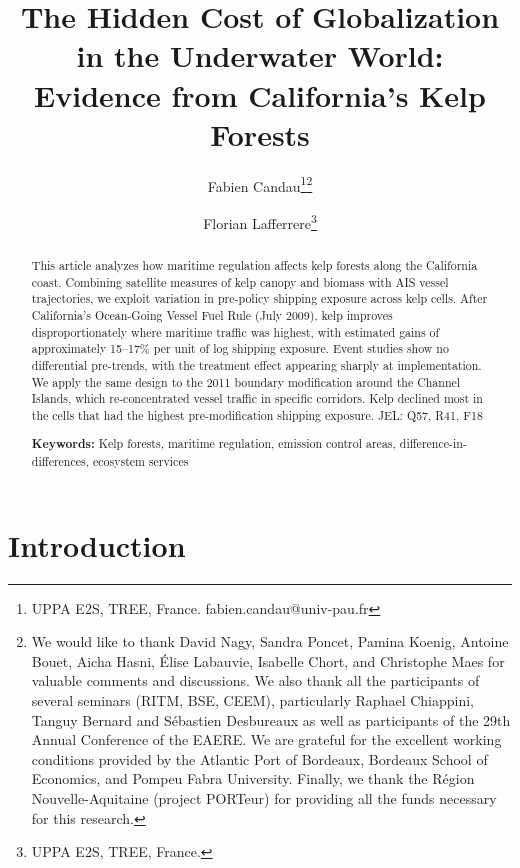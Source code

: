 \documentclass[12pt]{article}
\begin{document}
\title{The Hidden Cost of Globalization in the Underwater World: Evidence from California's Kelp Forests}
\author{\large Fabien Candau\thanks{UPPA E2S, TREE, France. fabien.candau@univ-pau.fr}\thanks{We would like to thank David Nagy, Sandra Poncet, Pamina Koenig, Antoine Bouet, Aicha Hasni, \'{E}lise Labauvie, Isabelle Chort, and Christophe Maes for valuable comments and discussions. We also thank all the participants of several seminars (RITM, BSE, CEEM), particularly Raphael Chiappini, Tanguy Bernard and S\'{e}bastien Desbureaux as well as participants of the 29th Annual Conference of the EAERE.
We are grateful for the excellent working conditions provided by the Atlantic Port of Bordeaux, Bordeaux School of Economics, and Pompeu Fabra University. Finally, we thank the R\'{e}gion Nouvelle-Aquitaine (project PORTeur) for providing all the funds necessary for this research.} \and \large Florian Lafferrere\thanks{UPPA E2S, TREE, France.}}
\maketitle
\begin{abstract}
This article analyzes how maritime regulation affects kelp forests along the California coast. Combining satellite measures of kelp canopy and biomass with AIS vessel trajectories, we exploit variation in pre-policy shipping exposure across kelp cells. After California's Ocean-Going Vessel Fuel Rule (July 2009), kelp improves disproportionately where maritime traffic was highest, with estimated gains of approximately 15--17\% per unit of log shipping exposure. Event studies show no differential pre-trends, with the treatment effect appearing sharply at implementation. We apply the same design to the 2011 boundary modification around the Channel Islands, which re-concentrated vessel traffic in specific corridors. Kelp declined most in the cells that had the highest pre-modification shipping exposure. JEL: Q57, R41, F18

\medskip
\noindent\textbf{Keywords:} Kelp forests, maritime regulation, emission control areas, difference-in-differences, ecosystem services
\end{abstract}

\section{Introduction}
\end{document}
